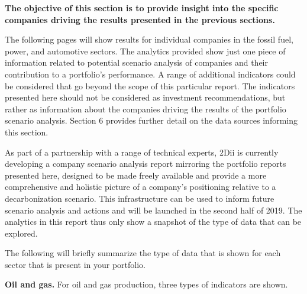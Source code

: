 \documentclass[10pt,table,a4]{article}\usepackage[]{graphicx}\usepackage[]{color}
\begin{document}
	\begin{multicols}{2}
		
		\textbf{The objective of this section is to provide insight into the specific companies driving the results presented in the previous sections.}
		
		The following pages will show results for individual companies in the fossil fuel, power, and automotive sectors. The analytics provided show just one piece of information related to potential scenario analysis of companies and their contribution to a portfolio's performance. A range of additional indicators could be considered that go beyond the scope of this particular report. The indicators presented here should not be considered as investment recommendations, but rather as information about the companies driving the results of the portfolio scenario analysis. Section 6 provides further detail on the data sources informing this section. 
		
		As part of a partnership with a range of technical experts, 2Dii is currently developing a company scenario analysis report mirroring the portfolio reports presented here, designed to be made freely available and provide a more comprehensive and holistic picture of a company's positioning relative to a decarbonization scenario. This infrastructure can be used to inform future scenario analysis and actions and will be launched in the second half of 2019. The analytics in this report thus only show a snapshot of the type of data that can be explored. 
		
		The following will briefly summarize the type of data that is shown for each sector that is present in your portfolio. 
		
		\textbf{Oil and gas.} For oil and gas production, three types of indicators are shown. 
		

\end{multicols}
\end{document}
